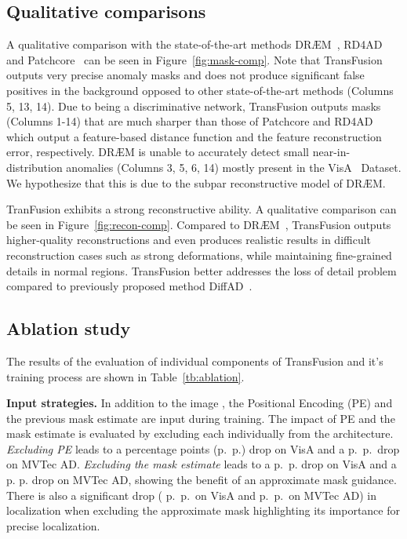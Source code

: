 \documentclass[10pt,twocolumn,letterpaper]{article}
\begin{document}
\subsection{Qualitative comparisons}

A qualitative comparison with the state-of-the-art methods DR{\AE}M~\cite{draem}, RD4AD~\cite{reverse_dist} and Patchcore~\cite{patchcore} can be seen in Figure~\ref{fig:mask-comp}. Note that TransFusion outputs very precise anomaly masks and does not produce significant false positives in the background opposed to other state-of-the-art methods (Columns 5, 13, 14). Due to being a discriminative network, TransFusion outputs masks (Columns 1-14) that are much sharper than those of Patchcore and RD4AD which output a feature-based distance function and the feature reconstruction error, respectively. DR{\AE}M is unable to accurately detect small near-in-distribution anomalies (Columns 3, 5, 6, 14) mostly present in the VisA~\cite{visa} Dataset. We hypothesize that this is due to the subpar reconstructive model of DR{\AE}M.

TranFusion exhibits a strong reconstructive ability. A qualitative comparison can be seen in Figure~\ref{fig:recon-comp}. Compared to DR{\AE}M~\cite{draem}, TransFusion outputs higher-quality reconstructions and even produces realistic results in difficult reconstruction cases such as strong deformations, while maintaining fine-grained details in normal regions. TransFusion better addresses the loss of detail problem compared to previously proposed method DiffAD~\cite{ldm_draem}.





\subsection{Ablation study}
The results of the evaluation of individual components of TransFusion and it's training process are shown in Table~\ref{tb:ablation}.

\noindent\textbf{Input strategies.} In addition to the image , the Positional Encoding (PE) and the previous mask estimate are input during training. The impact of PE and the mask estimate is evaluated by excluding each individually from the architecture. \textit{Excluding PE} leads to a  percentage points (p.\ p.) drop on VisA and a  p.\ p.\ drop on MVTec AD. \textit{Excluding the mask estimate} leads to a  p.\ p. drop on VisA and a  p. p. drop on MVTec AD, showing the benefit of an approximate mask guidance. There is also a significant drop ( p.\ p.\ on VisA and  p.\ p.\ on MVTec AD) in localization when excluding the approximate mask highlighting its importance for precise localization.
\end{document}
